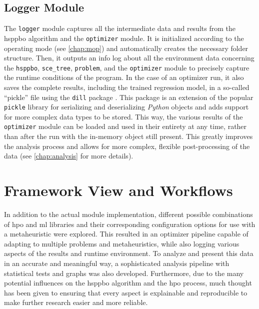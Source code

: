 \subsection{Logger Module}

The \texttt{logger} module captures all the intermediate data and results from the \gls{hsppbo} algorithm and the \texttt{optimizer} module. It is initialized according to the operating mode (see \cref{chap:mop}) and automatically creates the necessary folder structure. Then, it outputs an info log about all the environment data concerning the \texttt{hsppbo}, \texttt{sce\_tree}, \texttt{problem}, and the \texttt{optimizer} module to precisely capture the runtime conditions of the program. In the case of an optimizer run, it also saves the complete results, including the trained regression model, in a so-called \enquote{pickle} file using the \texttt{dill} package \cite{mckerns2012building}. This package is an extension of the popular \texttt{pickle} library for serializing and deserializing \textit{Python} objects and adds support for more complex data types to be stored. This way, the various results of the \texttt{optimizer} module can be loaded and used in their entirety at any time, rather than after the run with the in-memory object still present.
This greatly improves the analysis process and allows for more complex, flexible post-processing of the data (see \cref{chap:analysis} for more details).

\section{Framework View and Workflows}
\label{chap:workflow}

In addition to the actual module implementation, different possible combinations of \gls{hpo} and \gls{ml} libraries and their corresponding configuration options for use with a metaheuristic were explored. This resulted in an optimizer pipeline capable of adapting to multiple problems and metaheuristics, while also logging various aspects of the results and runtime environment. To analyze and present this data in an accurate and meaningful way, a sophisticated analysis pipeline with statistical tests and graphs was also developed.
Furthermore, due to the many potential influences on the \gls{hsppbo} algorithm and the \gls{hpo} process, much thought has been given to ensuring that every aspect is explainable and reproducible to make further research easier and more reliable.

